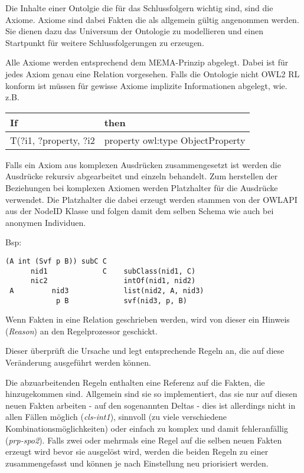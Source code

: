 Die Inhalte einer Ontolgie die für das Schlussfolgern wichtig sind, sind die Axiome. Axiome sind dabei Fakten die als allgemein gültig angenommen werden. Sie dienen dazu das Universum der Ontologie zu modellieren und einen Startpunkt für weitere Schlussfolgerungen zu erzeugen.

Alle Axiome werden entsprechend dem MEMA-Prinzip abgelegt. Dabei ist für jedes Axiom genau eine Relation vorgesehen. Falls die Ontologie nicht OWL2 RL konform ist müssen für gewisse Axiome implizite Informationen abgelegt, wie. z.B.

\begin{table}
	\begin{tabular}{|l|l|}
    \hline
    If & then \\
    \hline
	T(?i1, ?property, ?i2 & property owl:type ObjectProperty \\
	\hline
    \end{tabular}
\end{table}


Falls ein Axiom aus komplexen Ausdrücken zusammengesetzt ist werden die Ausdrücke rekursiv abgearbeitet und einzeln behandelt. Zum herstellen der Beziehungen bei komplexen Axiomen werden Platzhalter für die Ausdrücke verwendet. Die Platzhalter die dabei erzeugt werden stammen von der OWLAPI aus der NodeID Klasse und folgen damit dem selben Schema wie auch bei anonymen Individuen.

Bsp:
\begin{verbatim}
(A int (Svf p B)) subC C
      nid1             C    subClass(nid1, C)
      nic2                  intOf(nid1, nid2)
 A         nid3             list(nid2, A, nid3)
            p B             svf(nid3, p, B)
\end{verbatim}

Wenn Fakten in eine Relation geschrieben werden, wird von dieser ein Hinweis (\emph{Reason}) an den Regelprozessor geschickt.

Dieser überprüft die Ursache und legt entsprechende Regeln an, die auf diese Veränderung ausgeführt werden können.

Die abzuarbeitenden Regeln enthalten eine Referenz auf die Fakten, die hinzugekommen sind. Allgemein sind sie so implementiert, das sie nur auf diesen neuen Fakten arbeiten -  auf den sogenannten Deltas - dies ist allerdings nicht in allen Fällen möglich (\emph{cls-int1}), sinnvoll (zu viele verschiedene Kombinationsmöglichkeiten) oder einfach zu komplex und damit fehleranfällig (\emph{prp-spo2}). Falls zwei oder mehrmals eine Regel auf die selben neuen Fakten erzeugt wird bevor sie ausgelöst wird, werden die beiden Regeln zu einer zusammengefasst und können je nach Einstellung neu priorisiert werden.

